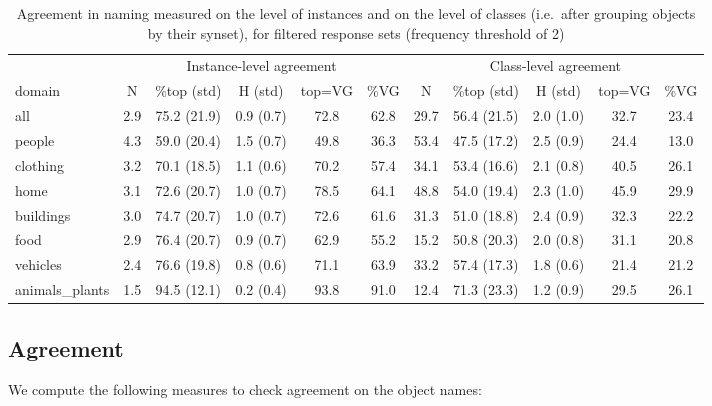 \begin{table}
\begin{tabular}{lccccc|ccccc}
\toprule
 & \multicolumn{5}{c|}{Instance-level agreement} & \multicolumn{5}{c}{Class-level agreement}\\ 
          domain &    N &         \%top (std) &          H (std) & top=VG &   \%VG &     N &         \%top (std) &          H (std) & top=VG &   \%VG \\
\midrule
            all &  2.9 &  75.2 (21.9) &  0.9 (0.7) &   72.8 &  62.8 &  29.7 &  56.4 (21.5) &  2.0 (1.0) &   32.7 &  23.4 \\
            \midrule
                     people &  4.3 &  59.0 (20.4) &  1.5 (0.7) &   49.8 &  36.3 &  53.4 &  47.5 (17.2) &  2.5 (0.9) &   24.4 &  13.0 \\
       clothing &  3.2 &  70.1 (18.5) &  1.1 (0.6) &   70.2 &  57.4 &  34.1 &  53.4 (16.6) &  2.1 (0.8) &   40.5 &  26.1 \\
           home &  3.1 &  72.6 (20.7) &  1.0 (0.7) &   78.5 &  64.1 &  48.8 &  54.0 (19.4) &  2.3 (1.0) &   45.9 &  29.9 \\
                 buildings &  3.0 &  74.7 (20.7) &  1.0 (0.7) &   72.6 &  61.6 &  31.3 &  51.0 (18.8) &  2.4 (0.9) &   32.3 &  22.2 \\
           food &  2.9 &  76.4 (20.7) &  0.9 (0.7) &   62.9 &  55.2 &  15.2 &  50.8 (20.3) &  2.0 (0.8) &   31.1 &  20.8 \\
                  vehicles &  2.4 &  76.6 (19.8) &  0.8 (0.6) &   71.1 &  63.9 &  33.2 &  57.4 (17.3) &  1.8 (0.6) &   21.4 &  21.2 \\
 animals\_plants &  1.5 &  94.5 (12.1) &  0.2 (0.4) &   93.8 &  91.0 &  12.4 &  71.3 (23.3) &  1.2 (0.9) &   29.5 &  26.1 \\
\bottomrule
\end{tabular}

\caption{Agreement in naming measured on the level of instances and on the level of \vgenome classes (i.e.\ after grouping objects by their \vgenome synset), for filtered response sets (frequency threshold of 2)}
\label{tab:agree}
\end{table}

\subsection{Agreement}

We compute the following measures to check agreement on the object names:

